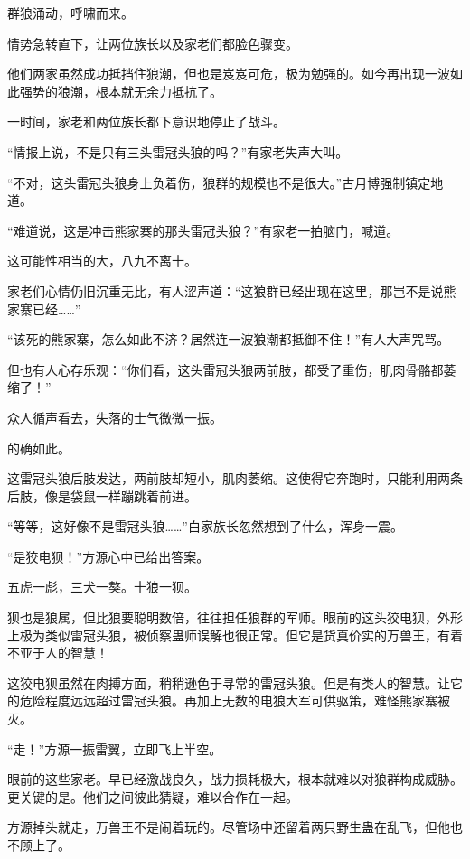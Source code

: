 
\begin{this_body}

群狼涌动，呼啸而来。

情势急转直下，让两位族长以及家老们都脸色骤变。

他们两家虽然成功抵挡住狼潮，但也是岌岌可危，极为勉强的。如今再出现一波如此强势的狼潮，根本就无余力抵抗了。

一时间，家老和两位族长都下意识地停止了战斗。

“情报上说，不是只有三头雷冠头狼的吗？”有家老失声大叫。

“不对，这头雷冠头狼身上负着伤，狼群的规模也不是很大。”古月博强制镇定地道。

“难道说，这是冲击熊家寨的那头雷冠头狼？”有家老一拍脑门，喊道。

这可能性相当的大，八九不离十。

家老们心情仍旧沉重无比，有人涩声道：“这狼群已经出现在这里，那岂不是说熊家寨已经……”

“该死的熊家寨，怎么如此不济？居然连一波狼潮都抵御不住！”有人大声咒骂。

但也有人心存乐观：“你们看，这头雷冠头狼两前肢，都受了重伤，肌肉骨骼都萎缩了！”

众人循声看去，失落的士气微微一振。

的确如此。

这雷冠头狼后肢发达，两前肢却短小，肌肉萎缩。这使得它奔跑时，只能利用两条后肢，像是袋鼠一样蹦跳着前进。

“等等，这好像不是雷冠头狼……”白家族长忽然想到了什么，浑身一震。

“是狡电狈！”方源心中已给出答案。

五虎一彪，三犬一獒。十狼一狈。

狈也是狼属，但比狼要聪明数倍，往往担任狼群的军师。眼前的这头狡电狈，外形上极为类似雷冠头狼，被侦察蛊师误解也很正常。但它是货真价实的万兽王，有着不亚于人的智慧！

这狡电狈虽然在肉搏方面，稍稍逊色于寻常的雷冠头狼。但是有类人的智慧。让它的危险程度远远超过雷冠头狼。再加上无数的电狼大军可供驱策，难怪熊家寨被灭。

“走！”方源一振雷翼，立即飞上半空。

眼前的这些家老。早已经激战良久，战力损耗极大，根本就难以对狼群构成威胁。更关键的是。他们之间彼此猜疑，难以合作在一起。

方源掉头就走，万兽王不是闹着玩的。尽管场中还留着两只野生蛊在乱飞，但他也不顾上了。


\end{this_body}
